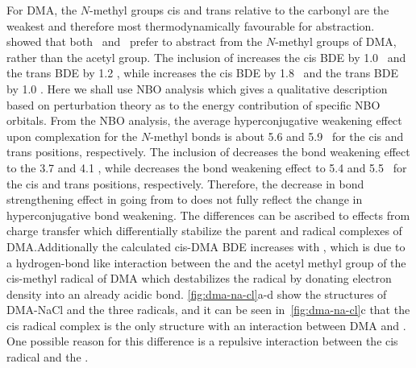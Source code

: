 For DMA, the $N$-methyl groups cis and trans relative to the carbonyl are the
weakest and therefore most thermodynamically favourable for abstraction.
\citet{Salamone2013} showed that both \bno\ and \cumo\ prefer to abstract from
the $N$-methyl groups of DMA, rather than the acetyl group. The inclusion of
 increases the cis BDE by 1.0 \kcalmol\ and the trans BDE by 1.2
\kcalmol, while  increases the cis BDE by 1.8 \kcalmol\ and the trans
BDE by 1.0 \kcalmol. Here we shall use NBO analysis which gives a qualitative
description based on perturbation theory as to the energy contribution of
specific NBO orbitals.\cite{Weinhold2016} From the NBO analysis, the average
hyperconjugative weakening effect upon complexation for the $N$-methyl 
bonds is about 5.6 and 5.9 \kcalmol\ for the cis and trans positions,
respectively. The inclusion of  decreases the bond weakening effect to
the 3.7 and 4.1 \kcalmol, while  decreases the bond weakening effect to
5.4 and 5.5 \kcalmol\ for the cis and trans positions, respectively. Therefore,
the decrease in bond strengthening effect in going from  to 
does not fully reflect the change in hyperconjugative bond weakening. The
differences can be ascribed to effects from charge transfer which differentially
stabilize the parent and radical complexes of DMA.\@ Additionally the calculated
cis-DMA BDE increases with , which is due to a hydrogen-bond like
interaction between the  and the acetyl methyl group of the cis-methyl
radical of DMA which destabilizes the radical by donating electron density into
an already acidic  bond. \ref{fig:dma-na-cl}a-d show the structures of
DMA-NaCl and the three radicals, and it can be seen in~\ref{fig:dma-na-cl}c that
the cis radical complex is the only structure with an interaction between DMA
and .  One possible reason for this difference is a repulsive
interaction between the cis radical and the .

